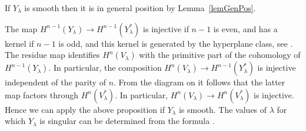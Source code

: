 \documentclass[11pt]{article}
\numberwithin{equation}{section}
\begin{document}
\begin{Remark} If $Y_\lambda$ is smooth then it is in general position by Lemma~\ref{lemGenPos}.

The map $H^ {n-1}(Y_{\lambda})\to H^{n-1}(Y_{\lambda}^*)$ is injective if $n-1$ is even, and has a kernel if $n-1$ is odd, and this kernel is generated by the hyperplane class, see \cite[Theorem~1.19]{Katz}. The residue map identif\/ies $H^{n}(V_{\lambda})$ with the primitive part of the cohomology of $H^{n-1}(Y_{\lambda})$. In particular, the composition $H^n(V_{\lambda})\to H^{n-1}(Y_{\lambda}^*)$ is injective independent of the parity of $n$. From the diagram on \cite[p.~79]{Katz} it follows that the latter map factors through $H^n(V_\lambda^*)$. In particular, $H^n(V_\lambda)\to H^n(V_\lambda^*)$ is injective. Hence we can apply the above proposition if $Y_\lambda$ is smooth. The values of $\lambda$ for which $Y_\lambda$ is singular can be determined from the formula \cite[Lemma~3.7]{zetafam}.
\end{Remark}
\end{document}

